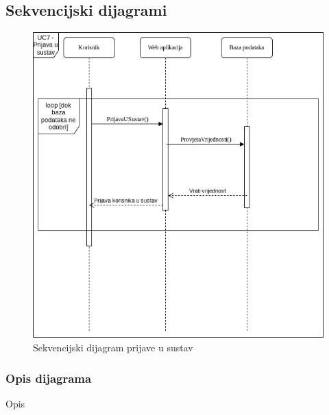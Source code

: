 				\eject		
				
			\subsection{Sekvencijski dijagrami}
					\begin{figure}[H]
						\centering
						\includegraphics[scale=0.5]{dijagrami/sekvencijski-dijagram-prijave-u-sustav.png}
						\caption{Sekvencijski dijagram prijave u sustav}
						\label{fig:sekv-prijava}
					\end{figure}
					\subsubsection{Opis dijagrama}
						Opis
					
